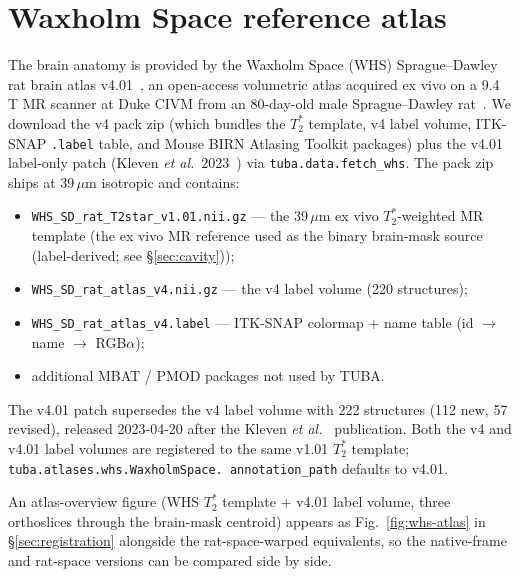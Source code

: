 \documentclass{compactarticle}
\begin{document}
\section{Waxholm Space reference atlas}
\label{sec:whs}

The brain anatomy is provided by the Waxholm Space (WHS) Sprague--Dawley
rat brain atlas v4.01~\cite{whs-v4}, an open-access volumetric atlas
acquired ex vivo on a 9.4\,T MR scanner at Duke CIVM from an 80-day-old
male Sprague--Dawley rat~\cite{whs-papp-2014}. We download the v4 pack
zip (which bundles the $T_2^*$ template, v4 label volume, ITK-SNAP
\texttt{.label} table, and Mouse BIRN Atlasing Toolkit packages) plus
the v4.01 label-only patch (Kleven \emph{et al.}\
2023~\cite{whs-v4}) via \texttt{tuba.data.fetch\_whs}. The pack zip
ships at 39\,$\mu$m isotropic and contains:
\begin{itemize}[leftmargin=*]
\setlength\itemsep{0pt}
  \item \texttt{WHS\_SD\_rat\_T2star\_v1.01.nii.gz} --- the 39\,$\mu$m
        ex vivo $T_2^*$-weighted MR template (the ex vivo MR reference used as the binary brain-mask source
        (label-derived; see \S\ref{sec:cavity}));
  \item \texttt{WHS\_SD\_rat\_atlas\_v4.nii.gz} --- the v4 label
        volume (220 structures);
  \item \texttt{WHS\_SD\_rat\_atlas\_v4.label} --- ITK-SNAP colormap
        + name table (id $\to$ name $\to$ RGB$\alpha$);
  \item additional MBAT / PMOD packages not used by TUBA.
\end{itemize}
The v4.01 patch supersedes the v4 label volume with 222 structures
(112 new, 57 revised), released 2023-04-20 after the
Kleven \emph{et al.}~\cite{whs-v4} publication. Both the v4 and v4.01
label volumes are registered to the same v1.01 $T_2^*$ template;
\texttt{tuba.atlases.whs.\allowbreak WaxholmSpace.\allowbreak
annotation\_path} defaults to v4.01.

An atlas-overview figure (WHS $T_2^*$ template + v4.01 label
volume, three orthoslices through the brain-mask centroid) appears
as Fig.~\ref{fig:whs-atlas} in \S\ref{sec:registration} alongside
the rat-space-warped equivalents, so the native-frame and
rat-space versions can be compared side by side.
\end{document}
